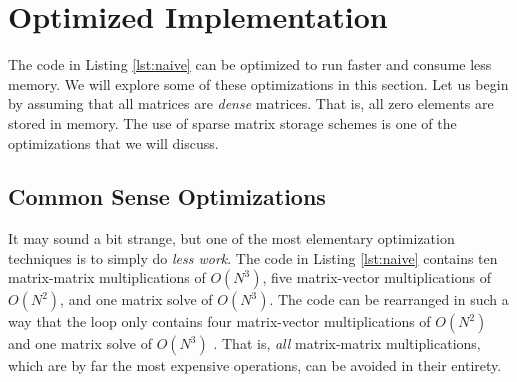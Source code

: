 \section{Optimized Implementation}

The code in Listing \ref{lst:naive} can be optimized to run faster and consume less memory. We will explore some of these optimizations in this section. Let us begin by assuming that all matrices are \emph{dense} matrices. That is, all zero elements are stored in memory. The use of sparse matrix storage schemes is one of the optimizations that we will discuss.

\subsection{Common Sense Optimizations}

It may sound a bit strange, but one of the most elementary optimization techniques is to simply do \emph{less work}. The code in Listing \ref{lst:naive} contains ten matrix-matrix multiplications of $O(N^3)$, five matrix-vector multiplications of $O(N^2)$, and one matrix solve of $O(N^3)$. The code can be rearranged in such a way that the loop only contains four matrix-vector multiplications of $O(N^2)$ and one matrix solve of $O(N^3)$ \parencite{hager2010introduction}. That is, \emph{all} matrix-matrix multiplications, which are by far the most expensive operations, can be avoided in their entirety. 

